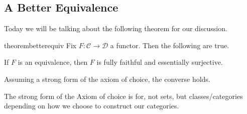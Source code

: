 \documentclass[../notes.tex]{subfiles}
\begin{document}

\subsection{A Better Equivalence}

Today we will be talking about the following theorem for our discussion.
\begin{restatable}{theorem}{betterequiv} \label{thm:betterequiv}
	Fix $F:\mathcal C\to\mathcal D$ a functor. Then the following are true.
	\begin{listalph}
		\item If $F$ is an equivalence, then $F$ is fully faithful and essentially surjective.
		\item Assuming a strong form of the axiom of choice, the converse holds.
	\end{listalph}
\end{restatable}
\begin{remark}
	The strong form of the Axiom of choice is for, not sets, but classes/categories depending on how we choose to construct our categories.
\end{remark}
\end{document}
